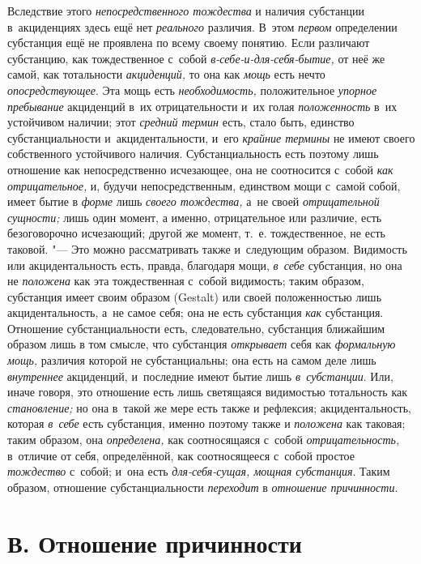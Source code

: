 Вследствие этого {\em непосредственного тождества} и
наличия субстанции в~акциденциях здесь ещё нет
{\em реального} различия. В~этом
{\em первом} определении субстанция ещё не проявлена по
всему своему понятию. Если различают субстанцию, как тождественное с~собой
{\em в-себе-и-для-себя-бытие,} от неё же самой, как
тотальности {\em акциденций,} то она как
{\em мощь} есть нечто
{\em опосредствующее}. Эта мощь есть
{\em необходимость,} положительное
{\em упорное пребывание} акциденций в~их
отрицательности и~их голая {\em положенность} в~их
устойчивом наличии; этот {\em средний термин} есть,
стало быть, единство субстанциальности и~акцидентальности, и~его
{\em крайние термины} не имеют своего собственного
устойчивого наличия. Субстанциальность есть поэтому лишь отношение как
непосредственно исчезающее, она не соотносится с~собой
{\em как отрицательное,} и, будучи непосредственным,
единством мощи с~самой собой, имеет бытие в {\em форме}
лишь {\em своего тождества,} а~не своей
{\em отрицательной сущности;} лишь один момент, а
именно, отрицательное или различие, есть безоговорочно исчезающий; другой
же момент, т.~е. тождественное, не есть таковой. "--- Это можно рассматривать
также и~следующим образом. Видимость или акцидентальность есть, правда,
благодаря мощи, {\em в~себе} субстанция, но она не
{\em положена} как эта тождественная с~собой видимость;
таким образом, субстанция имеет своим образом (Gestalt) или своей
положенностью лишь акцидентальность, а~не самое себя; она не есть
субстанция {\em как} субстанция. Отношение
субстанциальности есть, следовательно, субстанция ближайшим образом лишь в
том смысле, что субстанция {\em открывает} себя как
{\em формальную мощь,} различия которой не
субстанциальны; она есть на самом деле лишь
{\em внутреннее} акциденций, и~последние имеют бытие
лишь {\em в~субстанции}. Или, иначе говоря, это
отношение есть лишь светящаяся видимостью тотальность как
{\em становление;} но она в~такой же мере есть также и
рефлексия; акцидентальность, которая {\em в~себе} есть
субстанция, именно поэтому также и {\em положена} как
таковая; таким образом, она {\em определена,} как
соотносящаяся с~собой {\em отрицательность,} в~отличие
от себя, определённой, как соотносящееся с~собой простое
{\em тождество} с~собой; и~она есть {\em для-себя-сущая, мощная
субстанция}. Таким образом, отношение субстанциальности
{\em переходит} в {\em отношение причинности}.


\section[В. Отношение причинности]{В. Отношение причинности}

